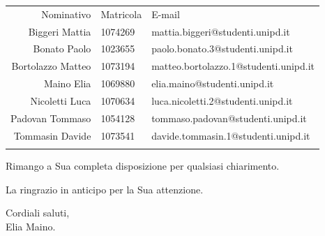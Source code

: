 \documentclass[a4paper]{article}
\begin{document}
	\begin{table}[H]
			\begin{tabularx}{\textwidth}{r l k}
				Nominativo & Matricola & E-mail \\
				Biggeri Mattia & 1074269 & mattia.biggeri@studenti.unipd.it \\
				Bonato Paolo & 1023655 & paolo.bonato.3@studenti.unipd.it\\
				Bortolazzo Matteo & 1073194 & matteo.bortolazzo.1@studenti.unipd.it \\
				Maino Elia & 1069880 & elia.maino@studenti.unipd.it \\
				Nicoletti Luca & 1070634 & luca.nicoletti.2@studenti.unipd.it \\
				Padovan Tommaso & 1054128 & tommaso.padovan@studenti.unipd.it \\
				Tommasin Davide & 1073541 & davide.tommasin.1@studenti.unipd.it \\
			\end{tabularx}
			\label{ComponentiGruppo}
	\end{table}
	\begin{flushleft}
		Rimango a Sua completa disposizione per qualsiasi chiarimento.
	\end{flushleft}
	\begin{flushleft}
		La ringrazio in anticipo per la Sua attenzione.
	\end{flushleft}
	\begin{center}
		Cordiali saluti,\\
		Elia Maino.
	\end{center}
	
\end{document}
